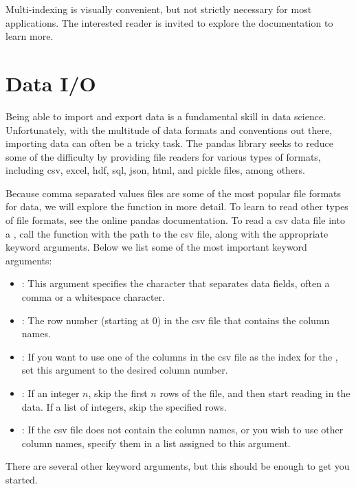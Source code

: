 Multi-indexing is visually convenient, but not strictly necessary for most applications.
The interested reader is invited to explore the documentation to learn more.

\section*{Data I/O}
Being able to import and export data is a fundamental skill in data science. Unfortunately, with the
multitude of data formats and conventions out there, importing data can often be a tricky task. The pandas library
seeks to reduce some of the difficulty by providing file readers for various types of formats, including
csv, excel, hdf, sql, json, html, and pickle files, among others.

Because comma separated values files are some of the most popular file formats for data, we will explore the
 function in more detail. To learn to read other types of file formats, see the online pandas documentation.
To read a csv data file into a , call the  function with the path to the csv file,
along with the appropriate keyword arguments. Below we list some of the most important keyword arguments:
\begin{itemize}
\item {}:
This argument specifies the character that separates data fields, often a comma or a whitespace character.

\item {}:
The row number (starting at 0) in the csv file that contains the column names.

\item {}:
If you want to use one of the columns in the csv file as the index for the ,
set this argument to the desired column number.

\item {}:
If an integer $n$, skip the first $n$ rows of the file, and then start reading in the data. If a list
of integers, skip the specified rows.

\item {}:
If the csv file does not contain the column names, or you wish to use other column names, specify them
in a list assigned to this argument.

\end{itemize}
There are several other keyword arguments, but this should be enough to get you started.

